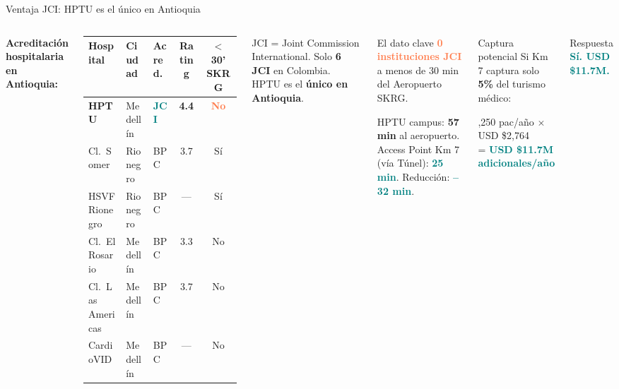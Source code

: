\documentclass[aspectratio=169, 11pt]{beamer}
\newcommand{\highlight}[1]{\textcolor{teal}{\textbf{#1}}}
\newcommand{\danger}[1]{\textcolor{coral}{\textbf{#1}}}
\newcommand{\src}[1]{\par\vspace{2pt}{\tiny\textcolor{slate}{Fuente: #1}}}
\begin{document}
\begin{frame}{Ventaja JCI: HPTU es el único en Antioquia}

\begin{columns}[T]
\vspace{2pt}
{\footnotesize\textbf{Acreditación hospitalaria en Antioquia:}}

\vspace{4pt}
{\tiny
\begin{tabular}{@{}lllcc@{}}
\toprule
\textbf{Hospital} & \textbf{Ciudad} & \textbf{Acred.} & \textbf{Rating} & \textbf{$<$30' SKRG} \\
\midrule
\rowcolor{teal!12}
\textbf{HPTU} & Medellín & \highlight{JCI} & \textbf{4.4} & \danger{No} \\
Cl.\ Somer & Rionegro & BPC & 3.7 & Sí \\
HSVF Rionegro & Rionegro & BPC & --- & Sí \\
Cl.\ El Rosario & Medellín & BPC & 3.3 & No \\
Cl.\ Las Americas & Medellín & BPC & 3.7 & No \\
CardioVID & Medellín & BPC & --- & No \\
\bottomrule
\end{tabular}
}

\vspace{3pt}
{\scriptsize JCI = Joint Commission International. Solo \textbf{6 JCI} en Colombia. HPTU es el \textbf{único en Antioquia}.}

\src{REPS BPC, JCI Directory, Google Places}

\vspace{2pt}
\begin{alertblock}{\small El dato clave}
\scriptsize
\danger{0 instituciones JCI} a menos de 30 min del Aeropuerto SKRG.

\vspace{3pt}
HPTU campus: \textbf{57 min} al aeropuerto.\\
Access Point Km 7 (vía Túnel): \highlight{25 min}. Reducción: \highlight{--32 min}.
\end{alertblock}

\vspace{4pt}
\begin{exampleblock}{\small Captura potencial}
\footnotesize
Si Km 7 captura solo \textbf{5\%} del turismo médico:

\vspace{3pt}
,250 pac/año $\times$ USD \$2,764\\
= \highlight{USD \$11.7M adicionales/año}
\end{exampleblock}

\vspace{4pt}
\begin{exampleblock}{\small Respuesta}
\centering\large
\highlight{Sí. USD \$11.7M.}
\end{exampleblock}
\end{columns}
\end{frame}
\end{document}
